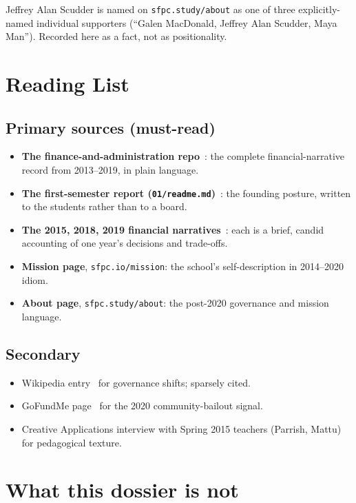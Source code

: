 \documentclass[10pt,letterpaper,twocolumn]{article}
\begin{document}
Jeffrey Alan Scudder is named on \texttt{sfpc.study/about} as one of three explicitly-named individual supporters (``Galen MacDonald, Jeffrey Alan Scudder, Maya Man''). Recorded here as a fact, not as positionality.

\section{Reading List}

\subsection{Primary sources (must-read)}

\begin{itemize}
\item \textbf{The finance-and-administration repo}~\citep{sfpcrepo}: the complete financial-narrative record from 2013--2019, in plain language.
\item \textbf{The first-semester report (\texttt{01/readme.md})}~\citep{sfpc01report}: the founding posture, written to the students rather than to a board.
\item \textbf{The 2015, 2018, 2019 financial narratives}~\citep{sfpc2015report,sfpc2018report,sfpc2019report}: each is a brief, candid accounting of one year's decisions and trade-offs.
\item \textbf{Mission page}, \texttt{sfpc.io/mission}: the school's self-description in 2014--2020 idiom.
\item \textbf{About page}, \texttt{sfpc.study/about}: the post-2020 governance and mission language.
\end{itemize}

\subsection{Secondary}

\begin{itemize}
\item Wikipedia entry~\citep{wikipediasfpc} for governance shifts; sparsely cited.
\item GoFundMe page~\citep{sfpcgofundme} for the 2020 community-bailout signal.
\item Creative Applications interview with Spring 2015 teachers (Parrish, Mattu) for pedagogical texture.
\end{itemize}

\section{What this dossier is not}
\end{document}
